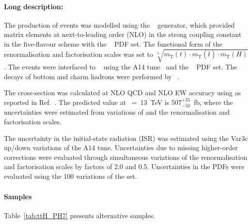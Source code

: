\paragraph{Long description:}

The production of \ttH events was modelled using the
\POWHEGBOX[v2]~\cite{Frixione:2007nw,Nason:2004rx,Frixione:2007vw,Alioli:2010xd,Hartanto:2015uka}
generator, which provided matrix elements at next-to-leading order (NLO) in the strong coupling 
constant \alphas in the five-flavour scheme with the \NNPDF[3.0nlo]~\cite{Ball:2014uwa} PDF set.
The functional form of the renormalisation and factorisation scales was
set to $\sqrt[3]{m_\text{T}(t)\cdot m_\text{T}(\bar{t}) \cdot m_\text{T}(H)}$.
The events were interfaced to \PYTHIA[8.230]~\cite{Sjostrand:2014zea}
using the A14 tune~\cite{ATL-PHYS-PUB-2014-021} and the
\NNPDF[2.3lo]~\cite{Ball:2014uwa} PDF set. The decays of bottom and charm hadrons
were performed by \EVTGEN[1.6.0]~\cite{Lange:2001uf}.

The cross-section was calculated at NLO QCD and NLO EW accuracy using
\MGNLO as reported in Ref.~\cite{deFlorian:2016spz}. The predicted value at \rts~=~\SI{13}{\TeV} is
507$^{+35}_{-50}$~fb, where the uncertainties were estimated from
variations of \alphas and the renormalisation and factorisation scales.

The uncertainty in the initial-state radiation (ISR) was estimated using the Var3c
up/down variations of the A14 tune. Uncertainties due to missing
higher-order corrections were evaluated through simultaneous variations of the
renormalisation and factorisation scales by factors of
2.0 and 0.5. Uncertainties in the PDFs were evaluated using the 100
variations of the \NNPDF[3.0nlo] set.

\subsubsection[Powheg+Herwig7]{\POWHER[7]}

\paragraph{Samples}

Table~\ref{tab:ttH_PH7} presents alternative \ttH samples.

